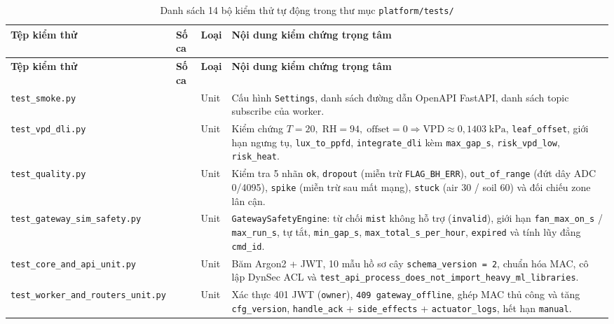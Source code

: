 \begingroup
\scriptsize
\sloppy
\setlength{\tabcolsep}{3pt}
\renewcommand{\arraystretch}{1.1}
\begin{longtable}{|>{\raggedright\arraybackslash}p{}|>{\centering\arraybackslash}p{}|>{\centering\arraybackslash}p{}|>{\raggedright\arraybackslash}p{}|}
\caption{Danh sách 14 bộ kiểm thử tự động trong thư mục \texttt{platform/tests/}}\label{tab:unit-test-suites}\\
\hline
\textbf{Tệp kiểm thử} & \textbf{Số ca} & \textbf{Loại} & \textbf{Nội dung kiểm chứng trọng tâm} \\
\hline
\endfirsthead
\hline
\textbf{Tệp kiểm thử} & \textbf{Số ca} & \textbf{Loại} & \textbf{Nội dung kiểm chứng trọng tâm} \\
\hline
\endhead
\texttt{test\_smoke.py} & 4 & Unit & Cấu hình \texttt{Settings}, danh sách đường dẫn OpenAPI FastAPI, danh sách topic subscribe của worker. \\ \hline
\texttt{test\_vpd\_dli.py} & 5 & Unit & Kiểm chứng \(T=20,\;\text{RH}=94,\;\text{offset}=0 \Rightarrow \text{VPD} \approx 0{,}1403\;\text{kPa}\), \texttt{leaf\_offset}, giới hạn ngưng tụ, \texttt{lux\_to\_ppfd}, \texttt{integrate\_dli} kèm \texttt{max\_gap\_s}, \texttt{risk\_vpd\_low}, \texttt{risk\_heat}. \\ \hline
\texttt{test\_quality.py} & 5 & Unit & Kiểm tra 5 nhãn \texttt{ok}, \texttt{dropout} (miễn trừ \texttt{FLAG\_BH\_ERR}), \texttt{out\_of\_range} (đứt dây ADC 0/4095), \texttt{spike} (miễn trừ sau mất mạng), \texttt{stuck} (air 30 / soil 60) và đối chiếu zone lân cận. \\ \hline
\texttt{test\_gateway\_sim\_safety.py} & 3 & Unit & \texttt{GatewaySafetyEngine}: từ chối \texttt{mist} không hỗ trợ (\texttt{invalid}), giới hạn \texttt{fan\_max\_on\_s} / \texttt{max\_run\_s}, tự tắt, \texttt{min\_gap\_s}, \texttt{max\_total\_s\_per\_hour}, \texttt{expired} và tính lũy đẳng \texttt{cmd\_id}. \\ \hline
\texttt{test\_core\_and\_api\_unit.py} & 5 & Unit & Băm Argon2 + JWT, 10 mẫu hồ sơ cây \texttt{schema\_version = 2}, chuẩn hóa MAC, cô lập DynSec ACL và \texttt{test\_api\_process\_does\_not\_import\_heavy\_ml\_libraries}. \\ \hline
\texttt{test\_worker\_and\_routers\_unit.py} & 4 & Unit & Xác thực 401 JWT (\texttt{owner}), \texttt{409 gateway\_offline}, ghép MAC thủ công và tăng \texttt{cfg\_version}, \texttt{handle\_ack} + \texttt{side\_effects} + \texttt{actuator\_logs}, hết hạn \texttt{manual}. \\ \hline

\end{longtable}
